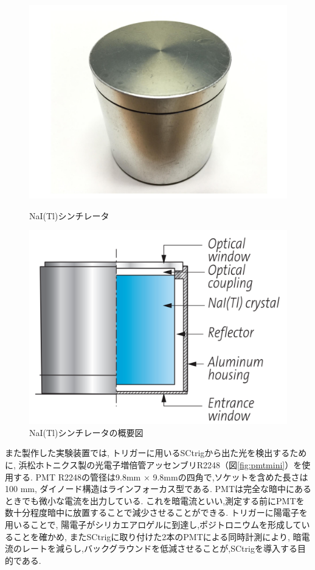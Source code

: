\begin{figure}[htbp]
\begin{minipage}{0.5\hsize}
\centering
\includegraphics[keepaspectratio,scale=0.35]{fig/ybm/naitl.pdf}
\caption{NaI(Tl)シンチレータ}
\label{fig:naitl}
\end{minipage}
\begin{minipage}{0.5\hsize}
\centering
\includegraphics[keepaspectratio,scale=0.35]{fig/ybm/naitl0.pdf}
	\caption{NaI(Tl)シンチレータの概要図\cite{nai}}
\label{fig:naitl0}
\end{minipage}
\end{figure}

また製作した実験装置では,
トリガーに用いるSCtrigから出た光を検出するために,
浜松ホトニクス製の光電子増倍管アッセンブリR2248（図\ref{fig:pmtmini}）を使用する.
PMT R2248の管径は9.8mm $\times$ 9.8mmの四角で,ソケットを含めた長さは100 mm,
ダイノード構造はラインフォーカス型である.
PMTは完全な暗中にあるときでも微小な電流を出力している.
これを暗電流といい,測定する前にPMTを数十分程度暗中に放置することで減少させることができる.
トリガーに陽電子を用いることで,
陽電子がシリカエアロゲルに到達し,ポジトロニウムを形成していることを確かめ,
またSCtrigに取り付けた2本のPMTによる同時計測により,
暗電流のレートを減らし,バックグラウンドを低減させることが,SCtrigを導入する目的である.

